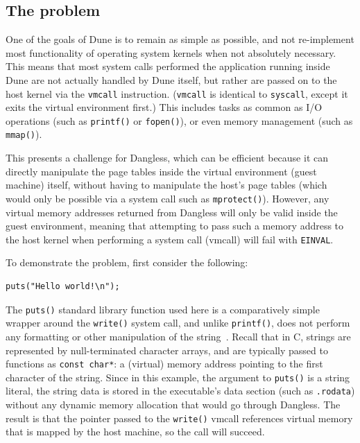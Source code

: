 \subsection{The problem}

One of the goals of Dune is to remain as simple as possible, and not re-implement most functionality of operating system kernels when not absolutely necessary. This means that most system calls performed the application running inside Dune are not actually handled by Dune itself, but rather are passed on to the host kernel via the \lstinline!vmcall! instruction. (\lstinline!vmcall! is identical to \lstinline!syscall!, except it exits the virtual environment first.) This includes tasks as common as I/O operations (such as \lstinline!printf()! or \lstinline!fopen()!), or even memory management (such as \lstinline!mmap()!).

This presents a challenge for Dangless, which can be efficient because it can directly manipulate the page tables inside the virtual environment (guest machine) itself, without having to manipulate the host's page tables (which would only be possible via a system call such as \lstinline!mprotect()!). However, any virtual memory addresses returned from Dangless will only be valid inside the guest environment, meaning that attempting to pass such a memory address to the host kernel when performing a system call (vmcall) will fail with \lstinline!EINVAL!.

To demonstrate the problem, first consider the following:

\begin{lstlisting}
puts("Hello world!\n");
\end{lstlisting}

The \lstinline!puts()! standard library function used here is a comparatively simple wrapper around the \lstinline!write()! system call, and unlike \lstinline!printf()!, does not perform any formatting or other manipulation of the string~\cite{glibc-puts-analysis}. Recall that in C, strings are represented by null-terminated character arrays, and are typically passed to functions as \lstinline!const char*!: a (virtual) memory address pointing to the first character of the string. Since in this example, the argument to \lstinline!puts()! is a string literal, the string data is stored in the executable's data section (such as \texttt{.rodata}) without any dynamic memory allocation that would go through Dangless. The result is that the pointer passed to the \lstinline!write()! vmcall references virtual memory that is mapped by the host machine, so the call will succeed.

